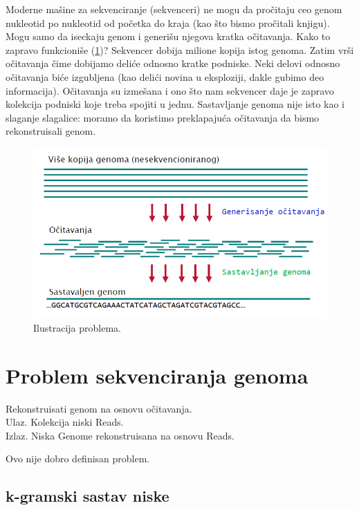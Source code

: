 Moderne mašine za sekvenciranje (sekvenceri) ne mogu da pročitaju ceo genom nukleotid po nukleotid od početka do kraja (kao što bismo pročitali knjigu).
Mogu samo da iseckaju genom i generišu njegova kratka očitavanja. Kako to zapravo funkcioniše (\ref{slika:sekvenciranje})? Sekvencer dobija milione kopija istog genoma. Zatim vrši očitavanja čime dobijamo deliće odnosno kratke podniske. Neki delovi odnosno očitavanja biće izgubljena (kao delići novina u eksploziji, dakle gubimo deo informacija). Očitavanja su izmešana i ono što nam sekvencer daje je zapravo kolekcija podniski koje treba spojiti u jednu. Sastavljanje genoma nije isto kao i slaganje slagalice: moramo da koristimo preklapajuća očitavanja da bismo rekonstruisali genom.


\begin{figure}[H]
	\centering
	\includegraphics[width=1\textwidth]{poglavlja/3/slike/sekvencioniranje.png}
	\caption{Ilustracija problema.}
	\label{slika:sekvenciranje}
\end{figure} 


\section{Problem sekvenciranja genoma}

\begin{problem}
	 Rekonstruisati genom na osnovu očitavanja.
	\\ Ulaz. Kolekcija niski Reads.
	\\ Izlaz. Niska Genome rekonstruisana na osnovu Reads.
\end{problem}

Ovo nije dobro definisan problem. 


\subsection{k-gramski sastav niske}

